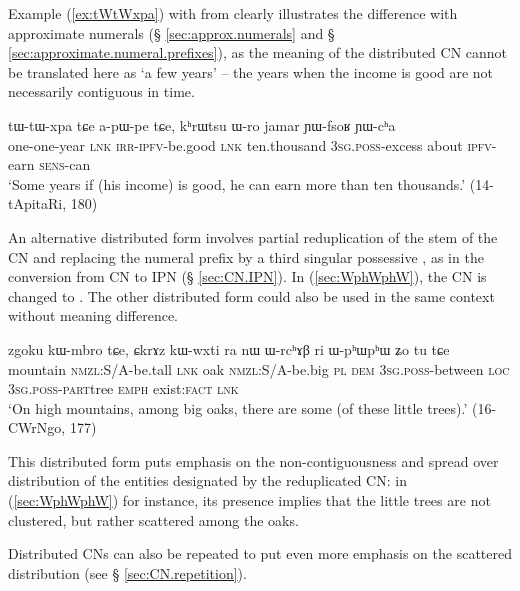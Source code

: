  Example (\ref{ex:tWtWxpa}) with  from  clearly illustrates the difference with approximate numerals (§ \ref{sec:approx.numerals} and § \ref{sec:approximate.numeral.prefixes}), as the meaning of the distributed CN cannot be translated here as `a few years' -- the years when the income is good are not necessarily contiguous in time.

\begin{exe}
\ex  \label{ex:tWtWxpa}
 \gll   tɯ-tɯ-xpa tɕe a-pɯ-pe tɕe, kʰrɯtsu ɯ-ro jamar ɲɯ-fsoʁ ɲɯ-cʰa \\
one-one-year  \textsc{lnk} \textsc{irr}-\textsc{ipfv}-be.good \textsc{lnk} ten.thousand \textsc{3sg}.\textsc{poss}-excess about \textsc{ipfv}-earn \textsc{sens}-can \\ 
 \glt `Some years if (his income) is good, he can earn more than ten thousands.' (14-tApitaRi, 180)
 \end{exe}

An alternative distributed form involves partial reduplication of the stem of the CN and replacing the numeral prefix by a third singular possessive , as in the conversion from CN to IPN (§ \ref{sec:CN.IPN}). In (\ref{sec:WphWphW}), the CN  is changed to . The other distributed form  could also be used in the same context without meaning difference. 

\begin{exe}
\ex \label{sec:WphWphW}
\gll zgoku kɯ-mbro tɕe, ɕkrɤz kɯ-wxti ra nɯ ɯ-rcʰɤβ ri ɯ-pʰɯ\redp{}pʰɯ ʑo tu tɕe \\
mountain \textsc{nmzl}:S/A-be.tall \textsc{lnk} oak \textsc{nmzl}:S/A-be.big \textsc{pl} \textsc{dem} \textsc{3sg}.\textsc{poss}-between \textsc{loc} \textsc{3sg}.\textsc{poss}-\textsc{part}\redp{}tree \textsc{emph} exist:\textsc{fact} \textsc{lnk} \\
\glt `On high mountains, among big oaks, there are some (of these little trees).' (16-CWrNgo, 177)
\end{exe}   

This distributed form puts emphasis on the non-contiguousness and spread over distribution of the entities designated by the reduplicated CN: in (\ref{sec:WphWphW}) for instance, its presence implies that the little trees are not clustered, but rather scattered among the oaks.

Distributed CNs can also be repeated to put even more emphasis on the scattered distribution (see § \ref{sec:CN.repetition}).

